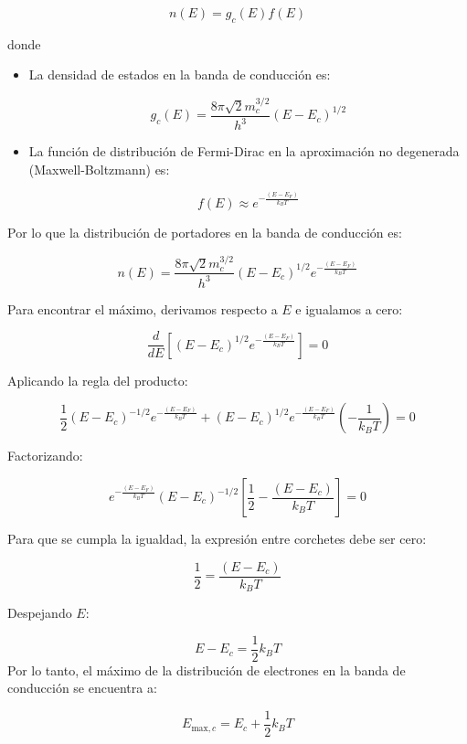 \begin{texercise}
\begin{enumerate}[label=\alph*)]
		      \[
			      n(E) = g_c(E) f(E)
		      \]

		      donde

		      \begin{itemize}
			      \item La densidad de estados en la banda de conducción es:

			            \[
				            g_c(E) = \frac{8\pi \sqrt{2} m_c^{3/2}}{h^3} (E - E_c)^{1/2}
			            \]

			      \item La función de distribución de Fermi-Dirac en la aproximación no degenerada (Maxwell-Boltzmann) es:

			            \[
				            f(E) \approx e^{-\frac{(E - E_F)}{k_B T}}
			            \]
		      \end{itemize}

		      Por lo que la distribución de portadores en la banda de conducción es:

		      \[
			      n(E) = \frac{8\pi \sqrt{2} m_c^{3/2}}{h^3} (E - E_c)^{1/2} e^{-\frac{(E - E_F)}{k_B T}}
		      \]

		      Para encontrar el máximo, derivamos respecto a \( E \) e igualamos a cero:

		      \[
			      \frac{d}{dE} \left[ (E - E_c)^{1/2} e^{-\frac{(E - E_F)}{k_B T}} \right] = 0
		      \]

		      Aplicando la regla del producto:

		      \[
			      \frac{1}{2} (E - E_c)^{-1/2} e^{-\frac{(E - E_F)}{k_B T}} + (E - E_c)^{1/2} e^{-\frac{(E - E_F)}{k_B T}} \left(-\frac{1}{k_B T} \right) = 0
		      \]

		      Factorizando:

		      \[
			      e^{-\frac{(E - E_F)}{k_B T}} (E - E_c)^{-1/2} \left[ \frac{1}{2} - \frac{(E - E_c)}{k_B T} \right] = 0
		      \]

		      Para que se cumpla la igualdad, la expresión entre corchetes debe ser cero:

		      \[
			      \frac{1}{2} = \frac{(E - E_c)}{k_B T}
		      \]

		      Despejando \( E \):

		      \[
			      E - E_c = \frac{1}{2} k_B T
		      \]
		      Por lo tanto, el máximo de la distribución de electrones en la banda de conducción se encuentra a:

		      \[
			      E_{\text{max}, c} = E_c + \frac{1}{2} k_B T
		      \]


\end{enumerate}
\end{texercise}
